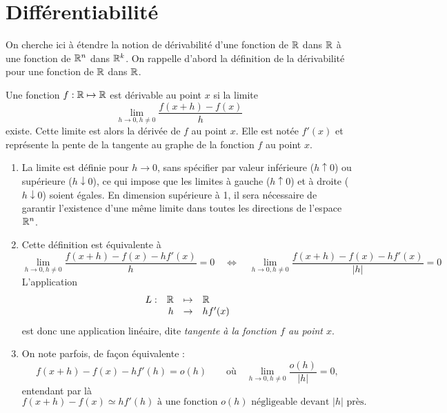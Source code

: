 \section{Différentiabilité} \label{sec:Multivar-Diff}


On cherche ici à étendre la notion de dérivabilité d'une fonction de $\mathbb{R}$ dans $\mathbb{R}$ à une fonction de $\mathbb{R}^n$ dans $\mathbb{R}^k$. On rappelle d'abord la définition de la dérivabilité pour une fonction de $\mathbb{R}$ dans $\mathbb{R}$.

\begin{definition}[Dérivabilité] \label{def:derivabilite}
  Une fonction $f: \mathbb{R} \mapsto \mathbb{R}$ est dérivable au point $x$ si la limite
  $$
  \lim_{h \to 0, h \neq 0} \frac{f(x+h) - f(x)}{h}
  $$
  existe. Cette limite est alors la dérivée de $f$ au point $x$. Elle est notée $f'(x)$ et représente la pente de la tangente au graphe de la fonction $f$ au point $x$.
\end{definition}

\remarks
\begin{enumerate}
  \item La limite est définie pour $h \to 0$, sans spécifier par valeur inférieure ($h \uparrow 0$) ou supérieure ($h \downarrow 0$), ce qui impose que les limites à gauche ($h \uparrow 0$) et à droite ($h \downarrow 0$) soient égales. En dimension supérieure à 1, il sera nécessaire de garantir l'existence d'une même limite dans toutes les directions de l'espace $\mathbb{R}^n$.
  \item Cette définition est équivalente à
  $$
  \lim_{h\to 0, h \neq 0} \frac{f(x+h) - f(x) - hf'(x)}{h} = 0
  \quad \Leftrightarrow \quad 
  \lim_{h\to 0, h \neq 0} \frac{f(x+h) - f(x) - hf'(x)}{|h|} = 0
  $$
  L'application 
  $$
  \begin{array}{rrcl}
    L :  & \mathbb{R} & \mapsto & \mathbb{R} \\
    & h & \to &  hf'(x)
  \end{array}
  $$
  est donc une application linéaire, dite {\sl tangente à la fonction $f$ au point $x$}.
  \item On note parfois, de façon équivalente :
  $$
  f(x+h) - f(x) - h f'(h) = o(h)
  \qquad \text{où} \quad
  \lim_{h\to 0, h \neq 0} \frac{o(h)}{|h|} = 0,
  $$
  entendant par là 
  $$
  \text{$f(x+h) - f(x) \simeq h f'(h)$ à une fonction $o(h)$ négligeable devant $|h|$ près.}
  $$
\end{enumerate}

